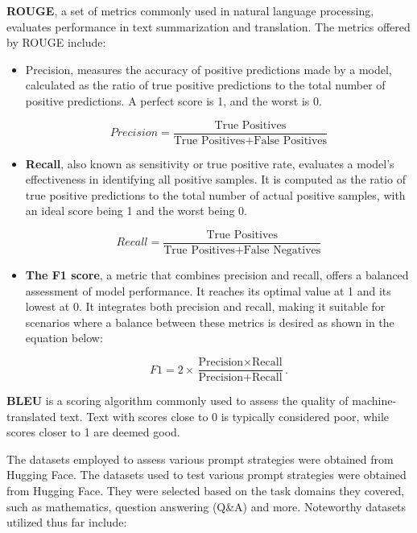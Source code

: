 \documentclass[fleqn,moreauthors,10pt]{ds_report}
\begin{document}
\textbf{ROUGE}, a set of metrics commonly used in natural language processing, evaluates performance in text summarization and translation. The metrics offered by ROUGE include:
\begin{itemize}
\item Precision, measures the accuracy of positive predictions made by a model, calculated as the ratio of true positive predictions to the total number of positive predictions. A perfect score is 1, and the worst is 0.

\setlength{\abovedisplayskip}{1pt}
\begin{equation}
	\label{eqn:Precision}
	Precision = \frac{\text{True Positives}}{\text{True Positives} + \text{False Positives}}
\end{equation}


\item \textbf{Recall}, also known as sensitivity or true positive rate, evaluates a model's effectiveness in identifying all positive samples. It is computed as the ratio of true positive predictions to the total number of actual positive samples, with an ideal score being 1 and the worst being 0.

\begin{equation}
	\label{eqn:Recall}
	Recall = \frac{\text{True Positives}}{\text{True Positives} + \text{False Negatives}}
\end{equation}

\item \textbf{The F1 score}, a metric that combines precision and recall, offers a balanced assessment of model performance. It reaches its optimal value at 1 and its lowest at 0. It integrates both precision and recall, making it suitable for scenarios where a balance between these metrics is desired as shown in the equation below:

\begin{equation}
	\label{eqn:F1}
	F1 = 2 \times \frac{\text{Precision} \times \text{Recall}}{\text{Precision} + \text{Recall}}.
\end{equation}

\end{itemize}

\textbf{BLEU} is a scoring algorithm commonly used to assess the quality of machine-translated text. Text with scores close to 0 is typically considered poor, while scores closer to 1 are deemed good.

The datasets employed to assess various prompt strategies were obtained from Hugging Face. The datasets used to test various prompt strategies were obtained from Hugging Face. They were selected based on the task domains they covered, such as mathematics, question answering (Q\&A) and more. Noteworthy datasets utilized thus far include:
\end{document}
